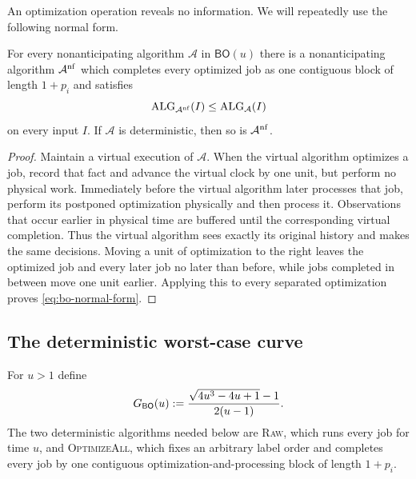 An optimization operation reveals no information.  We will repeatedly use
the following normal form.

\begin{lemma}
\label{lem:bo-normal-form}
For every nonanticipating algorithm $\mathcal A$ in $\mathsf{BO}(u)$ there is a
nonanticipating algorithm $\mathcal A^{\rm nf}$ which completes every optimized
job as one contiguous block of length $1+p_i$ and satisfies
\begin{equation}
 \operatorname{ALG}_{\mathcal A^{\rm nf}}(I)\le \operatorname{ALG}_{\mathcal A}(I)
 \label{eq:bo-normal-form}
\end{equation}
on every input $I$.  If $\mathcal A$ is deterministic, then so is
$\mathcal A^{\rm nf}$.
\end{lemma}

\begin{proof}
Maintain a virtual execution of $\mathcal A$.  When the virtual algorithm
optimizes a job, record that fact and advance the virtual clock by one unit,
but perform no physical work.  Immediately before the virtual algorithm later
processes that job, perform its postponed optimization physically and then
process it.  Observations that occur earlier in physical time are buffered
until the corresponding virtual completion.  Thus the virtual algorithm sees
exactly its original history and makes the same decisions.  Moving a unit of
optimization to the right leaves the optimized job and every later job no
later than before, while jobs completed in between move one unit earlier.
Applying this to every separated optimization proves
\eqref{eq:bo-normal-form}.
\end{proof}

\subsection{The deterministic worst-case curve}

For $u>1$ define
\begin{equation}
 G_{\mathsf{BO}}(u)
 \mathrel{:=} \frac{\sqrt{4u^3-4u+1}-1}{2(u-1)}.
 \label{eq:bo-det-optall-ratio}
\end{equation}
The two deterministic algorithms needed below are \textsc{Raw}, which runs
every job for time $u$, and \textsc{OptimizeAll}, which fixes an arbitrary
label order and completes every job by one contiguous optimization-and-processing
block of length $1+p_i$.

